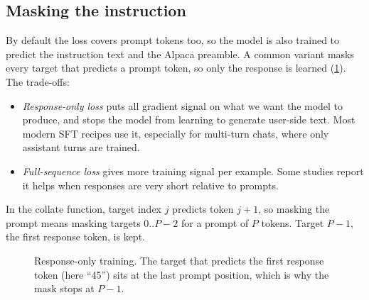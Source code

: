 \subsection{Masking the instruction}\label{sec:instruct:maskprompt}

By default the loss covers prompt tokens too, so the model is also trained to predict
the instruction text and the Alpaca preamble. A common variant masks every target that predicts a prompt token, so only the response
is learned (\cref{fig:instruct:maskprompt}). The trade-offs:
\begin{itemize}
\item \emph{Response-only loss} puts all gradient signal on what we want the model to
produce, and stops the model from learning to generate user-side text. Most modern
SFT recipes use it, especially for multi-turn chats, where only assistant turns are
trained.
\item \emph{Full-sequence loss} gives more training signal per example. Some studies
report it helps when responses are very short relative to prompts.
\end{itemize}
In the collate function, target index $j$ predicts token $j+1$, so masking the prompt
means masking targets $0..P-2$ for a prompt of $P$ tokens. Target $P-1$, the first
response token, is kept.

\begin{figure}[ht]
\centering
{}
\caption{Response-only training. The target that predicts the first response token
(here ``45'') sits at the last prompt position, which is why the mask stops at $P-1$.}
\label{fig:instruct:maskprompt}
\end{figure}


